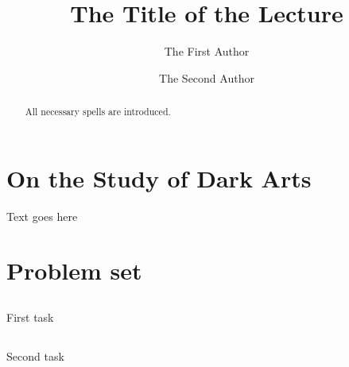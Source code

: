 \documentclass{lectureNotes}
\author{The First Author \and The Second Author}
\title{The Title of the Lecture}
\begin{document}
\begin{abstract}
All necessary spells are introduced.
\end{abstract}

\maketitle

\section{On the Study of Dark Arts}
Text goes here


\section{Problem set}
\subsection{}
First task
\subsection{}
Second task
\end{document}
